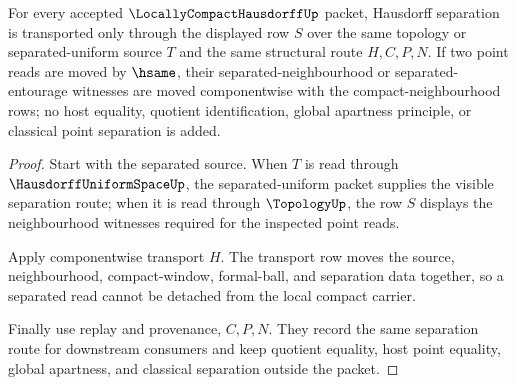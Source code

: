 \begin{theorem}
\label{thm:locally-compact-hausdorff-separation-transport}
For every accepted $\LocallyCompactHausdorffUp$ packet, Hausdorff separation is transported only through the displayed row $S$ over the same topology or separated-uniform source $T$ and the same structural route $H,C,P,N$. If two point reads are moved by $\hsame$, their separated-neighbourhood or separated-entourage witnesses are moved componentwise with the compact-neighbourhood rows; no host equality, quotient identification, global apartness principle, or classical point separation is added.
\end{theorem}
\begin{proof}
Start with the separated source. When $T$ is read through $\HausdorffUniformSpaceUp$, the separated-uniform packet supplies the visible separation route; when it is read through $\TopologyUp$, the row $S$ displays the neighbourhood witnesses required for the inspected point reads.

Apply componentwise transport $H$. The transport row moves the source, neighbourhood, compact-window, formal-ball, and separation data together, so a separated read cannot be detached from the local compact carrier.

Finally use replay and provenance, $C,P,N$. They record the same separation route for downstream consumers and keep quotient equality, host point equality, global apartness, and classical separation outside the packet.
\end{proof}


\begin{closurestatus}{\LocallyCompactHausdorffUp}
  \theoryclosure{\seedClosure}
  \formalstatus{\unformalizedV}
\end{closurestatus}

